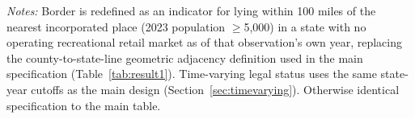 \begin{table}[htbp]
\centering
\caption{Appendix: Main pooled specification under the 100-mile nearest-nonlegal-city border definition}
\label{tab:main_pooled_100mi}
\footnotesize
{}
\begin{minipage}{0.98\textwidth}
\vspace{0.3em}
\footnotesize
\textit{Notes:} Border is redefined as an indicator for lying within 100 miles of the nearest incorporated
place (2023 population $\geq$5,000) in a state with no operating recreational retail market as of that
observation's own year, replacing the county-to-state-line geometric adjacency definition used in the main
specification (Table~\ref{tab:result1}). Time-varying legal status uses the same state-year cutoffs as the
main design (Section~\ref{sec:timevarying}). Otherwise identical specification to the main table.
\end{minipage}
\end{table}
